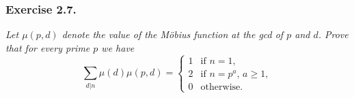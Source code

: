 \documentclass{article}
\begin{document}



\subsubsection*{Exercise 2.7.}
\emph{Let $\mu(p,d)$ denote the value of the M\"obius function at the gcd of $p$ and $d$.
Prove that for every prime $p$ we have
\begin{equation*}
  \sum_{d|n} \mu(d) \mu(p,d) =
  \begin{cases}
    1 & \text{if $n = 1$}, \\
    2 & \text{if $n = p^a$, $a \geq 1$}, \\
    0 & \text{otherwise}.
  \end{cases}
\end{equation*}
} \\
\end{document}

